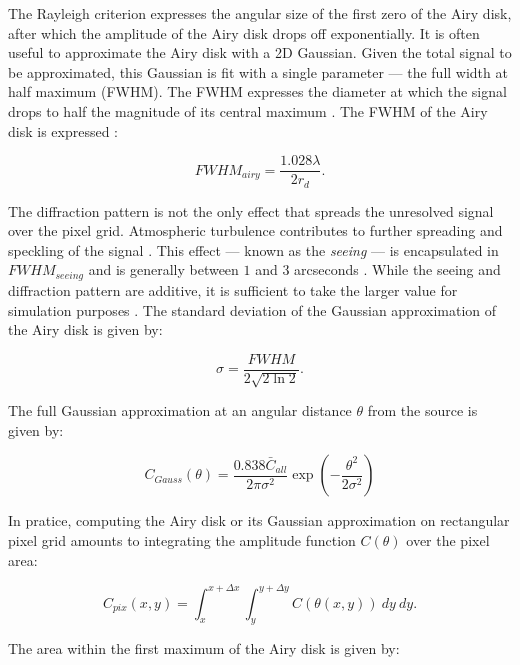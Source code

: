 The Rayleigh criterion expresses the angular size of the first zero of the Airy disk, after which the amplitude of the Airy disk drops off exponentially. It is often useful to approximate the Airy disk with a 2D Gaussian. Given the total signal to be approximated, this Gaussian is fit with a single parameter --- the full width at half maximum (FWHM). The FWHM expresses the diameter at which the signal drops to half the magnitude of its central maximum \cite{frueh2019notes}. The FWHM of the Airy disk is expressed \cite{frueh2019notes}:

\begin{equation} \label{eq:fwhm_airy}
  FWHM_{airy} = \frac{1.028 \lambda}{2 r_d}.
\end{equation}

The diffraction pattern is not the only effect that spreads the unresolved signal over the pixel grid. Atmospheric turbulence contributes to further spreading and speckling of the signal \cite{frueh2019notes}. This effect --- known as the \textit{seeing} --- is encapsulated in $FWHM_{seeing}$ and is generally between $1$ and $3$ arcseconds \cite{frueh2019notes}. While the seeing and diffraction pattern are additive, it is sufficient to take the larger value for simulation purposes \cite{frueh2019notes}. The standard deviation of the Gaussian approximation of the Airy disk is given by:

\begin{equation} \label{eq:airy_variance}
  \sigma = \frac{FWHM}{2 \sqrt{2 \ln{2}}}.
\end{equation}

The full Gaussian approximation at an angular distance $\theta$ from the source is given by:

\begin{equation} \label{eq:airy_gaussian}
  C_{Gauss}(\theta) = \frac{0.838 \bar{C}_{all}}{2 \pi \sigma^2} \exp\left( - \frac{\theta^2}{2 \sigma^2} \right)
\end{equation}

In pratice, computing the Airy disk or its Gaussian approximation on rectangular pixel grid amounts to integrating the amplitude function $C(\theta)$ over the pixel area:

\begin{equation}
  C_{pix}(x, y) = \int_{x}^{x + \Delta x} \int_{y}^{y + \Delta y}{C(\theta(x, y))} \: dy \: dy.
\end{equation}

The area within the first maximum of the Airy disk is given by:

